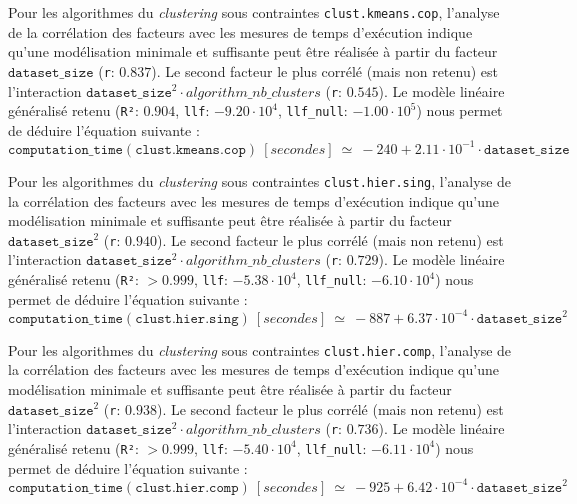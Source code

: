 			Pour les algorithmes du \textit{clustering} sous contraintes \texttt{clust.kmeans.cop}, l'analyse de la corrélation des facteurs avec les mesures de temps d'exécution indique qu'une modélisation minimale et suffisante peut être réalisée à partir du facteur $\texttt{dataset\_size}$ (\texttt{r}: $0.837$).
			Le second facteur le plus corrélé (mais non retenu) est l'interaction $\texttt{dataset\_size}^{2} \cdot algorithm\_nb\_clusters$ (\texttt{r}: $0.545$).
			Le modèle linéaire généralisé retenu (\texttt{R²}: $0.904$, \texttt{llf}: $-9.20 \cdot 10^{4}$, \texttt{llf\_null}: $-1.00 \cdot 10^{5}$) nous permet de déduire l'équation suivante :
			\begin{equation}
				\texttt{computation\_time}(\texttt{clust.kmeans.cop})~[secondes]~
				\simeq~-240 + 2.11 \cdot 10^{-1} \cdot \texttt{dataset\_size}
			\end{equation}
			
			Pour les algorithmes du \textit{clustering} sous contraintes \texttt{clust.hier.sing}, l'analyse de la corrélation des facteurs avec les mesures de temps d'exécution indique qu'une modélisation minimale et suffisante peut être réalisée à partir du facteur $\texttt{dataset\_size}^{2}$ (\texttt{r}: $0.940$).
			Le second facteur le plus corrélé (mais non retenu) est l'interaction $\texttt{dataset\_size}^{2} \cdot algorithm\_nb\_clusters$ (\texttt{r}: $0.729$).
			Le modèle linéaire généralisé retenu (\texttt{R²}: $> 0.999$, \texttt{llf}: $-5.38 \cdot 10^{4}$, \texttt{llf\_null}: $-6.10 \cdot 10^{4}$) nous permet de déduire l'équation suivante :
			\begin{equation}
				\texttt{computation\_time}(\texttt{clust.hier.sing})~[secondes]~
				\simeq~-887 + 6.37 \cdot 10^{-4} \cdot \texttt{dataset\_size}^{2}
			\end{equation}
			
			Pour les algorithmes du \textit{clustering} sous contraintes \texttt{clust.hier.comp}, l'analyse de la corrélation des facteurs avec les mesures de temps d'exécution indique qu'une modélisation minimale et suffisante peut être réalisée à partir du facteur $\texttt{dataset\_size}^{2}$ (\texttt{r}: $0.938$).
			Le second facteur le plus corrélé (mais non retenu) est l'interaction $\texttt{dataset\_size}^{2} \cdot algorithm\_nb\_clusters$ (\texttt{r}: $0.736$).
			Le modèle linéaire généralisé retenu (\texttt{R²}: $> 0.999$, \texttt{llf}: $-5.40 \cdot 10^{4}$, \texttt{llf\_null}: $-6.11 \cdot 10^{4}$) nous permet de déduire l'équation suivante :
			\begin{equation}
				\texttt{computation\_time}(\texttt{clust.hier.comp})~[secondes]~
				\simeq~-925 + 6.42 \cdot 10^{-4} \cdot \texttt{dataset\_size}^{2}
			\end{equation}

